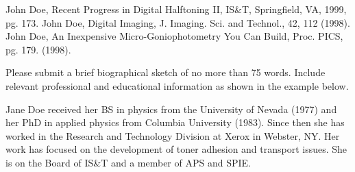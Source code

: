 \documentclass[letterpaper,twocolumn,fleqn]{article}
\begin{document}



\small
\begin{thebibliography}{9}
John Doe, Recent Progress in Digital Halftoning II,
  IS\&T, Springfield, VA, 1999, pg. 173.
John Doe, Digital Imaging, J. Imaging. Sci. and
  Technol., 42, 112 (1998).
John Doe, An Inexpensive Micro-Goniophotometry You Can
  Build, Proc. PICS, pg. 179. (1998).
\end{thebibliography}


\begin{biography}
Please submit a brief biographical sketch of no more than 75 words. 
Include relevant professional and educational information as shown 
in the example below.

Jane Doe received her BS in physics from the University of Nevada (1977) 
and her PhD in applied physics from Columbia University (1983). Since 
then she has worked in the Research and Technology Division at Xerox 
in Webster, NY. Her work has focused on the development of toner adhesion 
and transport issues. She is on the Board of  IS\&T and a member of APS 
and SPIE.
\end{biography}
\end{document}
